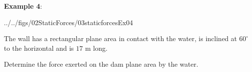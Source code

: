 \documentclass[10pt,onesided]{amsart}
\begin{document}
%
\newpage

\begin{minipage}[t]{0.45\textwidth}
	\raggedright
	\textbf{Example 4}:\\
	\begin{cfig}[0.6]{../../figs/02StaticForces/03staticforcesEx04}\end{cfig}
	The wall has a rectangular plane area in contact with the water, is
	inclined at $60^\circ$ to the horizontal and is $17$ m long.
	\par\smallskip
	Determine the force exerted on the dam plane area by the water.
	\vspace{2cm}
\end{minipage}
\hfill
\newpage
\end{document}

